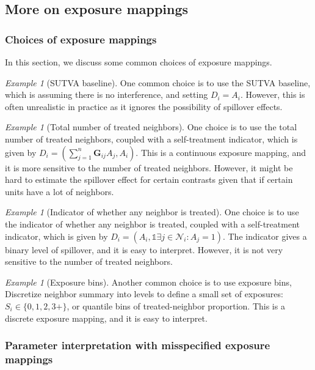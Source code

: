 \documentclass[twoside,letterpaper]{article}
\newcommand{\mathbbm}[1]{\mathds{#1}}
\theoremstyle{plain}
\theoremstyle{definition}
\theoremstyle{remark}
\newtheorem{example}[theorem]{Example}
\newcommand{\bG}{\boldsymbol{G}}
\newcommand{\cN}{\mathcal{N}}
\newcommand{\indicator}{\mathbbm{1}}
\newcommand{\sumj}{\sum_{j=1}^n}
\begin{document}
\subsection{More on exposure mappings}\label{sec:exposure_mapping}

\subsubsection{Choices of exposure mappings}

In this section, we discuss some common choices of exposure mappings. 
\begin{example}[SUTVA baseline]
    One common choice is to use the SUTVA baseline, which is assuming there is no interference, and setting $D_i = A_i$. However, this is often unrealistic in practice as it ignores the possibility of spillover effects.
\end{example}

\begin{example}[Total number of treated neighbors]
    One choice is to use the total number of treated neighbors, coupled with a self-treatment indicator, which is given by $D_i = (\sumj \bG_{ij}A_j, A_i)$. This is a continuous exposure mapping, and it is more sensitive to the number of treated neighbors. However, it might be hard to estimate the spillover effect for certain contrasts given that if certain units have a lot of neighbors. 
\end{example}

\begin{example}[Indicator of whether any neighbor is treated]
    One choice is to use the indicator of whether any neighbor is treated, coupled with a self-treatment indicator, which is given by $D_i = (A_i, \indicator{\exists j \in \cN_i : A_j = 1})$. The indicator gives a binary level of spillover, and it is easy to interpret. However, it is not very sensitive to the number of treated neighbors.
\end{example}

\begin{example}[Exposure bins]
    Another common choice is to use exposure bins, Discretize neighbor summary into levels to define a small set of exposures: $S_i \in \{0,1,2,3+\}$, or quantile bins of treated-neighbor proportion. This is a discrete exposure mapping, and it is easy to interpret. 
\end{example}

\subsubsection{Parameter interpretation with misspecified exposure mappings}
\end{document}
